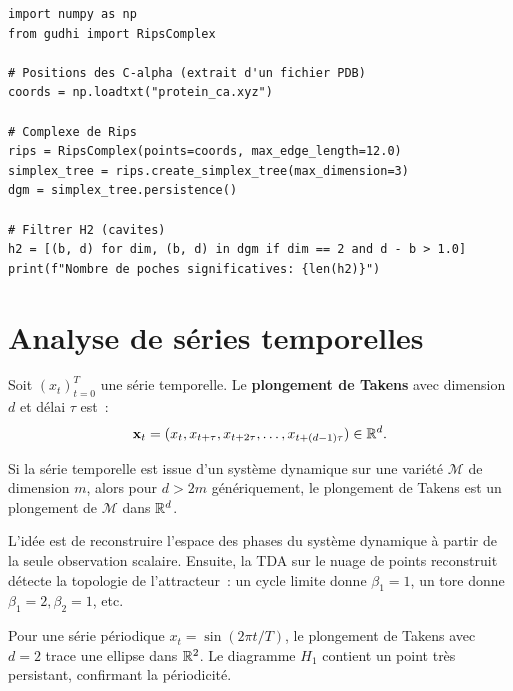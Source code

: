 \begin{verbatim}
import numpy as np
from gudhi import RipsComplex

# Positions des C-alpha (extrait d'un fichier PDB)
coords = np.loadtxt("protein_ca.xyz")

# Complexe de Rips
rips = RipsComplex(points=coords, max_edge_length=12.0)
simplex_tree = rips.create_simplex_tree(max_dimension=3)
dgm = simplex_tree.persistence()

# Filtrer H2 (cavites)
h2 = [(b, d) for dim, (b, d) in dgm if dim == 2 and d - b > 1.0]
print(f"Nombre de poches significatives: {len(h2)}")
\end{verbatim}

\section{Analyse de s\'eries temporelles}
\label{sec:series_temporelles}

\begin{definition}
Soit $(x_t)_{t=0}^{T}$ une s\'erie temporelle. Le \textbf{plongement
de Takens} avec dimension $d$ et d\'elai $\tau$ est~:
\[
  \mathbf{x}_t = (x_t, x_{t+\tau}, x_{t+2\tau}, \ldots, x_{t+(d-1)\tau})
  \in \mathbb{R}^d.
\]
\end{definition}

\begin{theoreme}[Takens, 1981]
Si la s\'erie temporelle est issue d'un syst\`eme dynamique sur
une vari\'et\'e $\mathcal{M}$ de dimension $m$, alors pour $d > 2m$
g\'en\'eriquement, le plongement de Takens est un plongement de
$\mathcal{M}$ dans $\mathbb{R}^d$.
\end{theoreme}

\begin{intuition}
L'id\'ee est de reconstruire l'espace des phases du syst\`eme
dynamique \`a partir de la seule observation scalaire. Ensuite,
la TDA sur le nuage de points reconstruit d\'etecte la topologie
de l'attracteur~: un cycle limite donne $\beta_1 = 1$, un tore
donne $\beta_1 = 2, \beta_2 = 1$, etc.
\end{intuition}

\begin{exemple}
Pour une s\'erie p\'eriodique $x_t = \sin(2\pi t / T)$, le
plongement de Takens avec $d = 2$ trace une ellipse dans $\mathbb{R}^2$.
Le diagramme $H_1$ contient un point tr\`es persistant,
confirmant la p\'eriodicit\'e.
\end{exemple}

